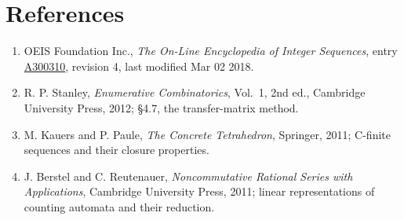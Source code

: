 \documentclass[11pt]{article}
\theoremstyle{definition}
\begin{document}
\section{References}

\begin{enumerate}

\item OEIS Foundation Inc., \emph{The On-Line Encyclopedia of Integer Sequences}, entry \href{https://oeis.org/A300310}{A300310}, revision 4, last modified Mar 02 2018.

\item R. P. Stanley, \emph{Enumerative Combinatorics}, Vol.~1, 2nd ed., Cambridge University Press, 2012; \S4.7, the transfer-matrix method.

\item M. Kauers and P. Paule, \emph{The Concrete Tetrahedron}, Springer, 2011; C-finite sequences and their closure properties.

\item J. Berstel and C. Reutenauer, \emph{Noncommutative Rational Series with Applications}, Cambridge University Press, 2011; linear representations of counting automata and their reduction.

\end{enumerate}
\end{document}
